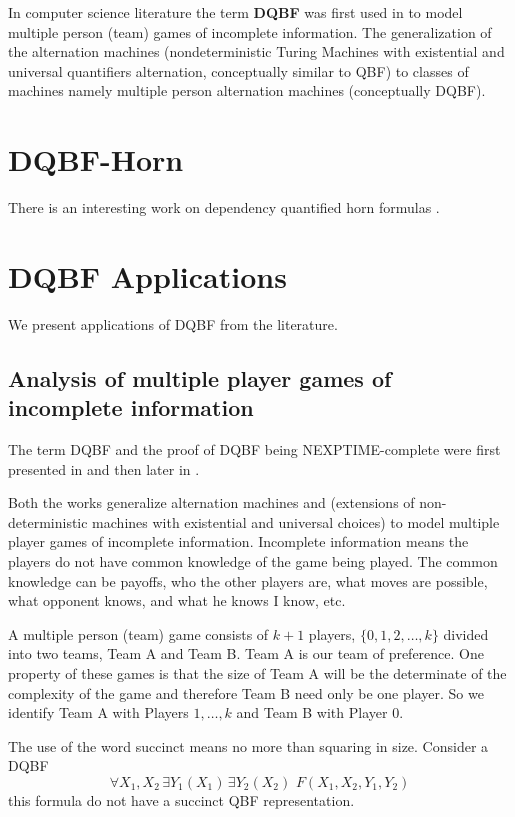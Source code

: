 \documentclass[runningheads]{llncs}
\begin{document}
In computer science literature the term \textbf{DQBF} was first used in \cite{peterson1979multiple} to model multiple person (team) games of incomplete information.
The generalization of the alternation machines (nondeterministic Turing Machines with existential and universal quantifiers alternation, conceptually similar to QBF) to classes of machines namely multiple person alternation machines (conceptually DQBF).

\section{DQBF-Horn}\label{sec:dqbf-horn}
There is an interesting work on dependency quantified horn formulas \cite{bubeckb06}.

\section{DQBF Applications}\label{sec:dqbf-applications}

We present applications of DQBF from the literature.

\subsection{Analysis of multiple player games of incomplete information}\label{subsec:multiplayer-games}

The term DQBF and the proof of DQBF being NEXPTIME-complete were first presented in \cite{peterson1979multiple} and then later in \cite{peterson2001lower}.

Both the works generalize alternation machines \cite{chandra1981lj} and \cite{fraenkel78} (extensions of non-deterministic machines with existential and universal choices) to model multiple player games of incomplete information.
Incomplete information means the players do not have common knowledge of the game being played.
The common knowledge can be payoffs, who the other players are, what moves are possible, what opponent knows, and what he knows I know, etc.

A multiple person (team) game consists of $k+1$ players, $\{0, 1,2, \dots ,k\}$ divided into two teams, Team A and Team B.
Team A is our team of preference.
One property of these games is that the size of Team A will be the determinate of the complexity of the game and therefore Team B need only be one player.
So we identify Team A with Players $1,\dots,k$ and Team B with Player 0.

The use of the word succinct means no more than squaring in size. Consider a DQBF
\[
\forall X_1,X_2 \, \exists Y_1(X_1) \, \exists Y_2(X_2) \,\, F (X_1, X_2, Y_1, Y_2)
\]
this formula do not have a succinct QBF representation.
\end{document}
